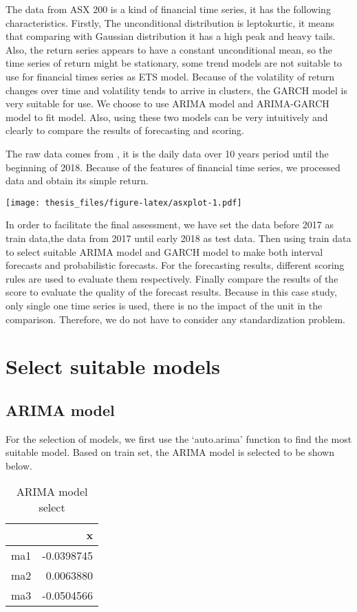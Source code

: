 \documentclass{monashthesis}
\theoremstyle{definition}
\theoremstyle{definition}
\theoremstyle{definition}
\theoremstyle{remark}
\begin{document}
The data from ASX 200 is a kind of financial time series, it has the
following characteristics. Firstly, The unconditional distribution is
leptokurtic, it means that comparing with Gaussian distribution it has a
high peak and heavy tails. Also, the return series appears to have a
constant unconditional mean, so the time series of return might be
stationary, some trend models are not suitable to use for financial
times series as ETS model. Because of the volatility of return changes
over time and volatility tends to arrive in clusters, the GARCH model is
very suitable for use. We choose to use ARIMA model and ARIMA-GARCH
model to fit model. Also, using these two models can be very intuitively
and clearly to compare the results of forecasting and scoring.

The raw data comes from \textcite{YH}, it is the daily data over 10
years period until the beginning of 2018. Because of the features of
financial time series, we processed data and obtain its simple return.

\texttt{[image: thesis\_files/figure-latex/asxplot-1.pdf]}

In order to facilitate the final assessment, we have set the data before
2017 as train data,the data from 2017 until early 2018 as test data.
Then using train data to select suitable ARIMA model and GARCH model to
make both interval forecasts and probabilistic forecasts. For the
forecasting results, different scoring rules are used to evaluate them
respectively. Finally compare the results of the score to evaluate the
quality of the forecast results. Because in this case study, only single
one time series is used, there is no the impact of the unit in the
comparison. Therefore, we do not have to consider any standardization
problem.

\section{Select suitable models}\label{select-suitable-models}

\subsection{ARIMA model}\label{arima-model}

For the selection of models, we first use the `auto.arima' function to
find the most suitable model. Based on train set, the ARIMA model is
selected to be shown below.

\begin{table}

\caption{\label{tab:arima}ARIMA model select}
\centering
\begin{tabular}[t]{lr}
\toprule
  & x\\
\midrule
ma1 & -0.0398745\\
ma2 & 0.0063880\\
ma3 & -0.0504566\\
\bottomrule
\end{tabular}
\end{table}
\end{document}
